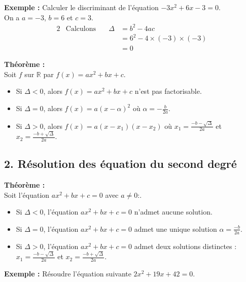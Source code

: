 \documentclass[11pt,a4paper]{article}
\begin{document}
\textbf{Exemple :} Calculer le discriminant de l'équation $-3x^2+6x-3=0$. \\

On a $a=-3$, $b=6$ et $c=3$.
\begin{alignat*}{2}
	 & \text{Calculons} \quad & \Delta & = b^2-4ac                 \\
	 &                        &        & = 6^2 - 4\times(-3)\times(-3) \\
	 &                        &        & = 0
\end{alignat*}

\begin{mdframed}[style=proprieteStyle]
	\textbf{Théorème :} ~\\
	Soit $f$ sur $\mathbb{R}$ par $f(x)=ax^2+bx+c$.
	\begin{itemize}
		\item Si $\Delta<0$, alors $f(x)=ax^2+bx+c$ n'est pas factorisable.
		\item Si $\Delta=0$, alors $f(x)=a(x-\alpha)^2$ où $\alpha=-\frac{b}{2a}$.
		\item Si $\Delta>0$, alors $f(x)=a(x-x_1)(x-x_2)$ où $x_1=\frac{-b-\sqrt{\Delta}}{2a}$ et $x_2=\frac{-b+\sqrt{\Delta}}{2a}$.
	\end{itemize}
\end{mdframed}

\subsection*{2. Résolution des équation du second degré}

\begin{mdframed}[style=proprieteStyle]
	\textbf{Théorème :} ~\\
	Soit l'équation $ax^2+bx+c=0$ avec $a\not=0$:.
	\begin{itemize}
		\item Si $\Delta<0$, l'équation $ax^2+bx+c=0$ n'admet aucune solution.
		\item Si $\Delta=0$, l'équation $ax^2+bx+c=0$ admet une unique solution $\alpha=\frac{-b}{2a}$.
		\item Si $\Delta>0$, l'équation $ax^2+bx+c=0$ admet deux solutions distinctes : $x_1=\frac{-b-\sqrt{\Delta}}{2a}$ et $x_2=\frac{-b+\sqrt{\Delta}}{2a}$.
	\end{itemize}
\end{mdframed}

\textbf{Exemple :} Résoudre l'équation suivante $2x^2+19x+42=0$. \\
\end{document}
